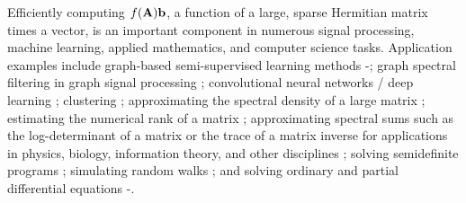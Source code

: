 \documentclass{article}
\begin{document}
Efficiently computing $f({\bf A}){\bf b}$, a function of a large, sparse Hermitian matrix times a vector, is an important component in numerous signal processing, machine learning, applied mathematics, and computer science tasks. Application examples include graph-based semi-supervised learning methods \cite{smola}\nocite{belkin_matveeva}-\cite{zhou_bousquet}; graph spectral filtering in graph signal processing \cite{shuman2013emerging}; convolutional neural networks / deep learning \cite{defferrard2016convolutional,bronstein2017geometric}; clustering \cite{tremblay2016compressive,orecchia2012approximating}; approximating the spectral density of a large matrix \cite{lin_spectral_density}; estimating the numerical rank of a matrix \cite{ubaru2016,ubaru2017}; approximating spectral sums such as the log-determinant of a matrix \cite{ubaru2017fast} or the trace of a matrix inverse for applications in physics, biology, information theory, and other disciplines \cite{han}; solving semidefinite programs \cite{arora2007combinatorial}; simulating random walks \cite[Chapter 8]{sachdeva2014faster}; and solving ordinary and partial differential equations \cite{hochbruck}\nocite{friesner}-\cite{gallopoulos}.


%
\end{document}
